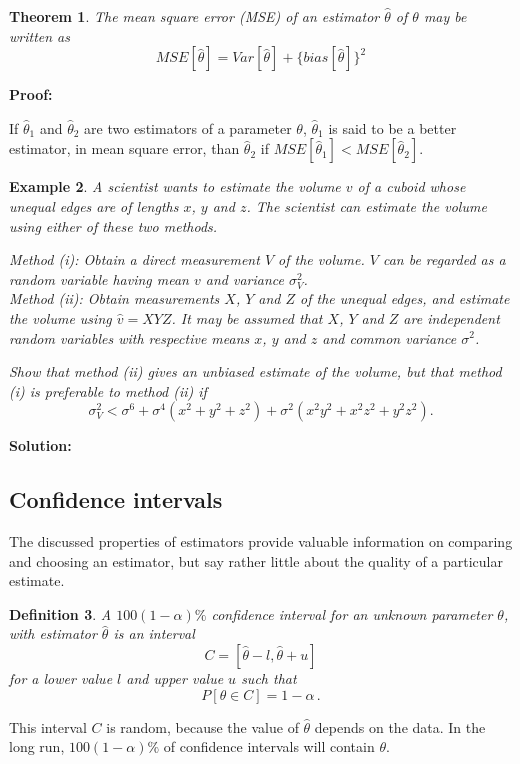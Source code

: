 \documentclass[12pt]{article}
\theoremstyle{break}
\newtheorem{theorem}{Theorem}[section]
\newtheorem{definition}[theorem]{Definition}
\newtheorem{example}[theorem]{Example}
\begin{document}
\begin{theorem}
The mean square error (MSE) of an estimator $\hat{\theta}$ of $\theta$ may be written as $$MSE[\hat{\theta}]=Var[\hat{\theta}]+\{bias[\hat{\theta}]\}^2$$
\end{theorem}
\begin{mdframed}
{\bf Proof:}
\textcolor[rgb]{1.00,1.00,1.00}{\lipsum[1-3]}
\end{mdframed}

If $\hat{\theta}_{1}$ and $\hat{\theta}_{2}$ are two estimators of a parameter $\theta$, $\hat{\theta}_{1}$ is said to be a better estimator, in mean square error, than $\hat{\theta}_{2}$ if $MSE[\hat{\theta}_{1}]<MSE[\hat{\theta}_{2}]$.


\begin{example}
A scientist wants to estimate the volume $v$ of a cuboid whose unequal edges are of lengths $x$, $y$ and $z$. The scientist can estimate the volume using either of these two methods.

\emph{Method (i): Obtain a direct measurement $V$ of the volume. $V$ can be regarded as a random variable having mean $v$ and variance $\sigma_{V}^{2}$. \\
      Method (ii): Obtain measurements $X$, $Y$ and $Z$ of the unequal edges, and estimate the volume using $\hat{v}=XYZ$. It may be assumed that $X$, $Y$ and $Z$ are independent random variables with respective means $x$, $y$ and $z$ and common variance $\sigma^{2}$.}

Show that method (ii) gives an unbiased estimate of the volume, but that method (i) is preferable to method (ii) if $$\sigma_{V}^{2}<\sigma^{6}+\sigma^{4}(x^{2}+y^{2}+z^{2})+\sigma^{2}(x^{2}y^{2}+x^{2}z^{2}+y^{2}z^{2}).$$
\end{example}

\begin{mdframed}
{\bf Solution:}
\textcolor[rgb]{1.00,1.00,1.00}{\lipsum[1-8]}
\end{mdframed}



\subsection{Confidence intervals}
The discussed properties of estimators provide valuable information on comparing and choosing an estimator, but say rather little about the quality of a particular estimate.
\begin{definition}
 A $100(1-\alpha)\%$ confidence interval for an unknown parameter $\theta$, with estimator $\hat{\theta}$ is an interval
$$C=[\hat{\theta}-l,\hat{\theta}+u]$$
for a lower value $l$ and upper value $u$ such that
$$P[\theta \in C]=1-\alpha\, .$$
\end{definition}
This interval $C$ is random, because the value of $\hat{\theta}$ depends on the data.  In the long run, $100(1 - \alpha)\%$ of confidence intervals will contain $\theta$.
\end{document}
